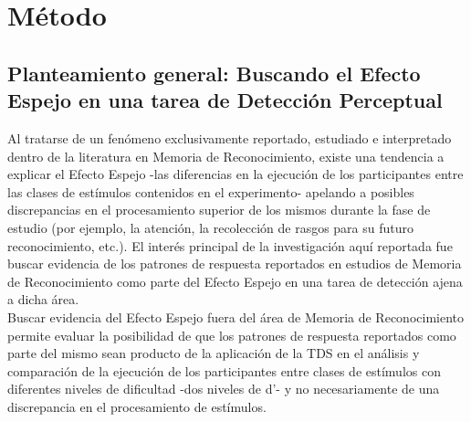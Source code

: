 
\chapter{Método} %

\label{Cap_Exp} %

\section{Planteamiento general: Buscando el Efecto Espejo en una tarea de Detección Perceptual}

Al tratarse de un fenómeno exclusivamente reportado, estudiado e interpretado dentro de la literatura en Memoria de Reconocimiento, existe una tendencia a explicar el Efecto Espejo -las diferencias en la ejecución de los participantes entre las clases de estímulos contenidos en el experimento- apelando a posibles discrepancias en el procesamiento superior de los mismos durante la fase de estudio (por ejemplo, la atención, la recolección de rasgos para su futuro reconocimiento, etc.). El interés principal de la investigación aquí reportada fue buscar evidencia de los patrones de respuesta reportados en estudios de Memoria de Reconocimiento como parte del Efecto Espejo en una tarea de detección ajena a dicha área.\\

Buscar evidencia del Efecto Espejo fuera del área de Memoria de Reconocimiento permite evaluar la posibilidad de que los patrones de respuesta reportados como parte del mismo sean producto de la aplicación de la TDS  en el análisis y comparación de la ejecución de los participantes entre clases de estímulos con diferentes niveles de dificultad -dos niveles de d'- y no necesariamente de una discrepancia en el procesamiento de estímulos.\\

